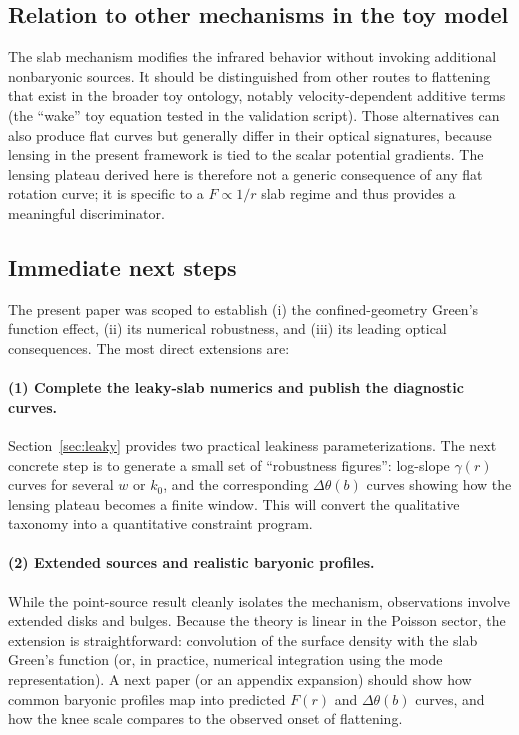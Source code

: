 \documentclass[11pt]{article}
\begin{document}
\subsection{Relation to other mechanisms in the toy model}
The slab mechanism modifies the infrared behavior without invoking additional nonbaryonic sources.
It should be distinguished from other routes to flattening that exist in the broader toy ontology,
notably velocity-dependent additive terms (the ``wake'' toy equation tested in the validation
script).  Those alternatives can also produce flat curves but generally differ in their optical
signatures, because lensing in the present framework is tied to the scalar potential gradients.
The lensing plateau derived here is therefore not a generic consequence of any flat rotation curve;
it is specific to a $F\propto 1/r$ slab regime and thus provides a meaningful discriminator.

\subsection{Immediate next steps}
The present paper was scoped to establish (i) the confined-geometry Green's function effect,
(ii) its numerical robustness, and (iii) its leading optical consequences.
The most direct extensions are:

\paragraph{(1) Complete the leaky-slab numerics and publish the diagnostic curves.}
Section~\ref{sec:leaky} provides two practical leakiness parameterizations.
The next concrete step is to generate a small set of ``robustness figures'':
log-slope $\gamma(r)$ curves for several $w$ or $k_0$, and the corresponding $\Delta\theta(b)$ curves
showing how the lensing plateau becomes a finite window.
This will convert the qualitative taxonomy into a quantitative constraint program.

\paragraph{(2) Extended sources and realistic baryonic profiles.}
While the point-source result cleanly isolates the mechanism, observations involve extended disks
and bulges.  Because the theory is linear in the Poisson sector, the extension is straightforward:
convolution of the surface density with the slab Green's function (or, in practice, numerical
integration using the mode representation).
A next paper (or an appendix expansion) should show how common baryonic profiles map into predicted
$F(r)$ and $\Delta\theta(b)$ curves, and how the knee scale compares to the observed onset of
flattening.
\end{document}

